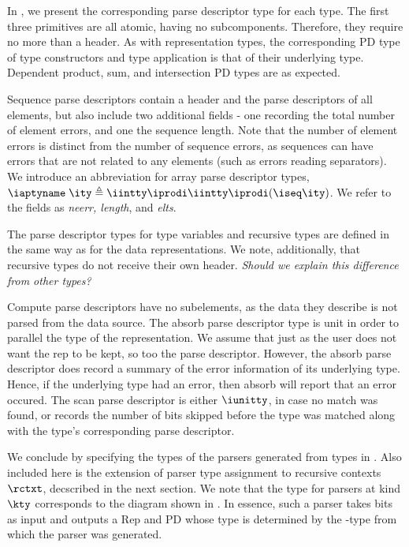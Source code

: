 In , we present the corresponding parse
descriptor type for each \ddc{} type. The first three \ddc{}
primitives are all atomic, having no subcomponents. Therefore, they
require no more than a header. As with representation types, the
corresponding PD type of type constructors and type application is
that of their underlying type.  Dependent product, sum, and
intersection PD types are as expected.

Sequence parse descriptors contain a header and the parse descriptors
of all elements, but also include two additional fields - one
recording the total number of element errors, and one the sequence
length. Note that the number of element errors is distinct from the
number of sequence errors, as sequences can have errors that are not
related to any elements (such as errors reading separators).  We
introduce an abbreviation for array parse descriptor types,
$\iaptyname \; \ity \triangleq \iintty \iprodi \iintty \iprodi (\iseq
\ity)$.  We refer to the fields as \textit{neerr, length}, and
\textit{elts}.

The parse descriptor types for type variables and recursive types are
defined in the same way as for the data representations. We note,
additionally, that recursive types do not receive their own
header. {\em Should we explain this difference from other types?}

Compute parse descriptors have no subelements, as the data they
describe is not parsed from the data source.  The absorb parse
descriptor type is unit in order to parallel the type of the
representation. We assume that just as the user does not want the rep
to be kept, so too the parse descriptor.  However, the absorb parse
descriptor does record a summary of the error information of its
underlying type.  Hence, if the underlying type had an error, then
absorb will report that an error occured. The scan parse descriptor is
either $\iunitty$, in case no match was found, or records the number
of bits skipped before the type was matched along with the type's
corresponding parse descriptor.

We conclude by specifying the \implang types of the parsers generated
from \ddc{} types in . Also included here is
the extension of parser type assignment to recursive contexts
$\rctxt$, decscribed in the next section. We note that the type for
parsers at kind $\kty$ corresponds to the diagram shown in
. In essence, such a parser takes bits
as input and outputs a Rep and PD whose type is determined by the
\ddc{}-type from which the parser was generated.

